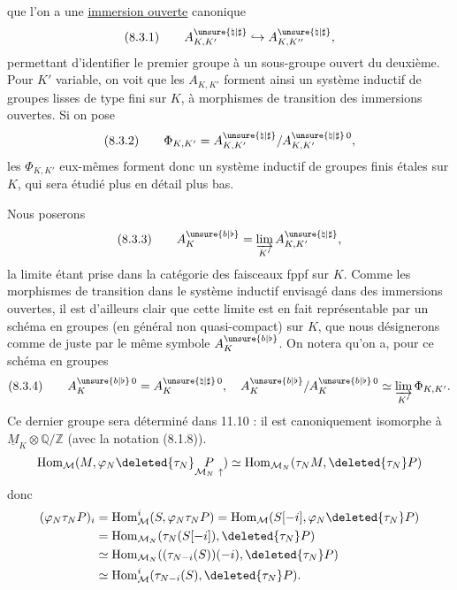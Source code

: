 que l'on a une \uline{immersion ouverte} canonique
\[
(8.3.1)\qquad A_{K,K'}^{\unsure{\natural|\sharp}}
 \hookrightarrow A_{K,K''}^{\unsure{\natural|\sharp}},
\]
permettant d'identifier le premier groupe à un sous-groupe ouvert du deuxième.
Pour \(K'\) variable, on voit que les \(A_{K,K'}\) forment ainsi un système inductif
de groupes lisses de type fini sur \(K\), à morphismes de transition des immersions
ouvertes. Si on pose
\[
(8.3.2)\qquad\Phi_{K,K'}=
 A_{K,K'}^{\unsure{\natural|\sharp}}/A_{K,K'}^{\unsure{\natural|\sharp}\,0},
\]
les \(\Phi_{K,K'}\) eux-mêmes forment donc un système inductif de groupes finis
étales sur \(K\), qui sera étudié plus en détail plus bas.

Nous poserons
\[
(8.3.3)\qquad A_K^{\unsure{b|\flat}}=
 \varinjlim_{K'}A_{K,K'}^{\unsure{\natural|\sharp}},
\]
la limite étant prise dans la catégorie des faisceaux fppf sur \(K\). Comme
les morphismes de transition dans le système inductif envisagé dans des immersions
ouvertes, il est d'ailleurs clair que cette limite est en fait représentable
par un schéma en groupes (en général non quasi-compact) sur \(K\), que nous
désignerons comme de juste par le même symbole \(A_K^{\unsure{b|\flat}}\).
On notera qu'on a, pour ce schéma en groupes
\[
(8.3.4)\qquad A_K^{\unsure{b|\flat}\,0}=A_K^{\unsure{\natural|\sharp}\,0},\quad
 A_K^{\unsure{b|\flat}}/A_K^{\unsure{b|\flat}\,0}
 \simeq\varinjlim_{K'}\Phi_{K,K'}.
\]
Ce dernier groupe sera déterminé dans 11.10 : il est canoniquement isomorphe
à \(\underline M_K\otimes\mathbb Q/\mathbb Z\) (avec la notation (8.1.8)).
\[
\operatorname{Hom}_{\mathcal M}(M,\varphi_N\deleted{\tau_N}
 \underset{\mathcal M_N\ \uparrow}{P})
 \simeq\operatorname{Hom}_{\mathcal M_N}(\tau_NM,\deleted{\tau_N}P)
\]
donc
\[
\begin{aligned}
(\varphi_N\tau_NP)_i
 &=\operatorname{Hom}^i_{\mathcal M}(S,\varphi_N\tau_NP)
 =\operatorname{Hom}_{\mathcal M}(S[-i],\varphi_N\deleted{\tau_N}P)\\
 &=\operatorname{Hom}_{\mathcal M_N}(\tau_N(S[-i]),\deleted{\tau_N}P)\\
 &\simeq\operatorname{Hom}_{\mathcal M_N}((\tau_{N-i}(S))(-i),\deleted{\tau_N}P)\\
 &\simeq\operatorname{Hom}^i_{\mathcal M}(\tau_{N-i}(S),\deleted{\tau_N}P).
\end{aligned}
\]
